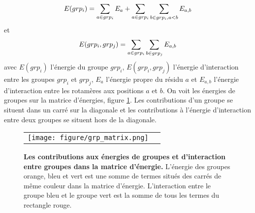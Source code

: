 \begin{equation}
E(grp_i) = \sum_{a \in grp_i}E_a + \sum_{a\in grp_i} \sum_{b\in grp_i, a < b}E_{a,b} \\
\end{equation}
et
\begin{equation}
E(grp_i,grp_j) = \sum_{a \in grp_i} \sum_{b \in grp_j} E_{a,b} \\
\end{equation}
avec $E(grp_i)$ l'énergie du groupe $grp_i$, $E(grp_i,grp_j)$ l'énergie d'interaction entre les groupes $grp_i$ et $grp_j$, $E_a$ l'énergie propre du résidu $a$ et $E_{a,b}$ l'énergie d'interaction entre les rotamères aux positions $a$ et $b$. On voit les énergies de groupes sur la matrice d'énergies, figure \ref{fig:matrix_grp}. Les contributions d'un groupe se situent dans un carré sur la diagonale et les contributions à l'énergie d'interaction entre deux groupes se situent hors de la diagonale.


   \begin{figure}[!htbp]
     \centering
     \begin{tabular}{cc}
       \texttt{[image: figure/grp\_matrix.png]} &
     \end{tabular}
     
     \caption{\textbf{Les contributions aux énergies de groupes et d'interaction entre groupes dans la matrice d'énergie.} L'énergie des groupes orange, bleu et vert est une somme de termes situés des carrés de même couleur dans la matrice d'énergie. L'interaction entre le groupe bleu et le groupe vert est la somme de tous les termes du rectangle rouge.}
\label{fig:matrix_grp}
   \end{figure}
   

